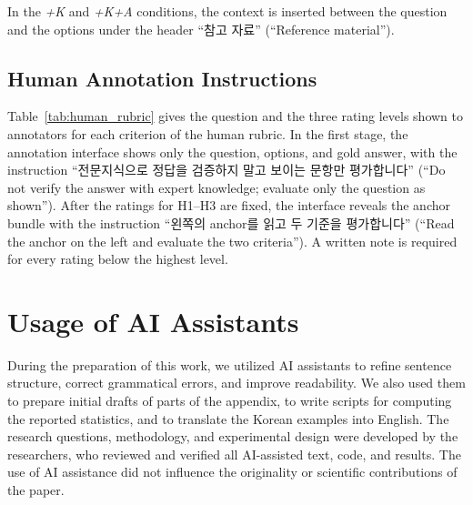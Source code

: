 
In the \textit{+K} and \textit{+K+A} conditions, the context is inserted between the question and the options under the header ``참고 자료'' (``Reference material'').


\subsection{Human Annotation Instructions}

Table~\ref{tab:human_rubric} gives the question and the three rating levels shown to annotators for each criterion of the human rubric.
In the first stage, the annotation interface shows only the question, options, and gold answer, with the instruction ``전문지식으로 정답을 검증하지 말고 보이는 문항만 평가합니다'' (``Do not verify the answer with expert knowledge; evaluate only the question as shown'').
After the ratings for H1--H3 are fixed, the interface reveals the anchor bundle with the instruction ``왼쪽의 anchor를 읽고 두 기준을 평가합니다'' (``Read the anchor on the left and evaluate the two criteria'').
A written note is required for every rating below the highest level.




\section{Usage of AI Assistants}
\label{app:ai_assistants}

During the preparation of this work, we utilized AI assistants to refine sentence structure, correct grammatical errors, and improve readability.
We also used them to prepare initial drafts of parts of the appendix, to write scripts for computing the reported statistics, and to translate the Korean examples into English.
The research questions, methodology, and experimental design were developed by the researchers, who reviewed and verified all AI-assisted text, code, and results.
The use of AI assistance did not influence the originality or scientific contributions of the paper.